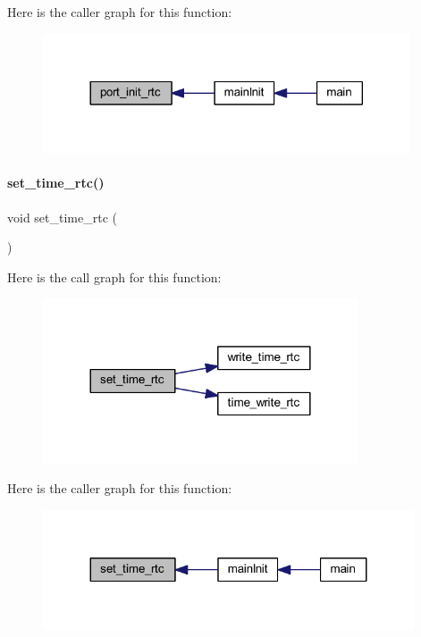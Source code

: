 Here is the caller graph for this function\+:
\nopagebreak
\begin{figure}[H]
\begin{center}
\leavevmode
\includegraphics[width=308pt]{a00044_a4144a5333b1a934957b78e4b2d0f8695_icgraph}
\end{center}
\end{figure}
\mbox{\label{a00044_af48611801cb8ae30f21f4263183355a4}} 
\paragraph{set\+\_\+time\+\_\+rtc()}
{\footnotesize\ttfamily void set\+\_\+time\+\_\+rtc (\begin{DoxyParamCaption}{ }\end{DoxyParamCaption})}

Here is the call graph for this function\+:
\nopagebreak
\begin{figure}[H]
\begin{center}
\leavevmode
\includegraphics[width=264pt]{a00044_af48611801cb8ae30f21f4263183355a4_cgraph}
\end{center}
\end{figure}
Here is the caller graph for this function\+:
\nopagebreak
\begin{figure}[H]
\begin{center}
\leavevmode
\includegraphics[width=311pt]{a00044_af48611801cb8ae30f21f4263183355a4_icgraph}
\end{center}
\end{figure}
\mbox{\label{a00044_addeadab81b94cc879a2d7f1310fad7cd}} 
